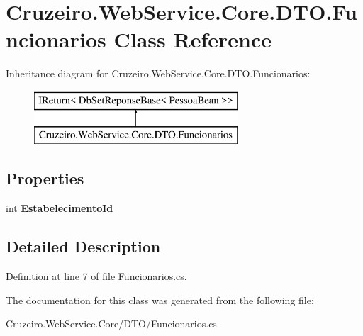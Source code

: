 \hypertarget{class_cruzeiro_1_1_web_service_1_1_core_1_1_d_t_o_1_1_funcionarios}{}\section{Cruzeiro.\+Web\+Service.\+Core.\+D\+T\+O.\+Funcionarios Class Reference}
\label{class_cruzeiro_1_1_web_service_1_1_core_1_1_d_t_o_1_1_funcionarios}
Inheritance diagram for Cruzeiro.\+Web\+Service.\+Core.\+D\+T\+O.\+Funcionarios\+:\begin{figure}[H]
\begin{center}
\leavevmode
\includegraphics[height=2.000000cm]{class_cruzeiro_1_1_web_service_1_1_core_1_1_d_t_o_1_1_funcionarios}
\end{center}
\end{figure}
\subsection*{Properties}
\begin{DoxyCompactItemize}
\item 
int {\bfseries Estabelecimento\+Id}\hypertarget{class_cruzeiro_1_1_web_service_1_1_core_1_1_d_t_o_1_1_funcionarios_aea0552c84fea246c97ad6b926655fafa}{}\label{class_cruzeiro_1_1_web_service_1_1_core_1_1_d_t_o_1_1_funcionarios_aea0552c84fea246c97ad6b926655fafa}

\end{DoxyCompactItemize}


\subsection{Detailed Description}


Definition at line 7 of file Funcionarios.\+cs.



The documentation for this class was generated from the following file\+:\begin{DoxyCompactItemize}
\item 
Cruzeiro.\+Web\+Service.\+Core/\+D\+T\+O/Funcionarios.\+cs\end{DoxyCompactItemize}
